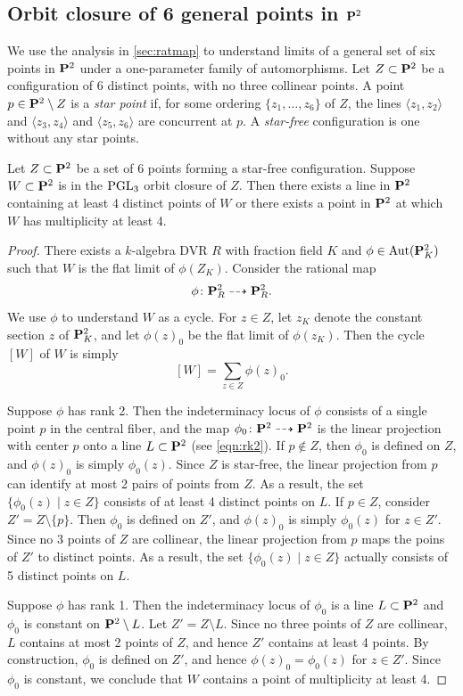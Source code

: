 \documentclass[12pt,reqno]{amsart}
\renewcommand{\k}{k}
\numberwithin{equation}{section}
\begin{document}
\subsection{Orbit closure of 6 general points in $\P^2$}\label{sec:orb6}
We use the analysis in \autoref{sec:ratmap} to understand limits of a general set of six points in $\P^2$ under a one-parameter family of automorphisms.
Let $Z \subset \P^2$ be a configuration of 6 distinct points, with no three collinear points.
A point $p \in \P^2 \setminus Z$ is a \emph{star point} if, for some ordering $\{z_1, \dots, z_6\}$ of $Z$, the lines $\langle z_1, z_2 \rangle$ and $\langle  z_3, z_4 \rangle$ and $\langle  z_5, z_6 \rangle$ are concurrent at $p$.
A \emph{star-free} configuration is one without any star points.

\begin{proposition}\label{prop:limit4}
  Let $Z \subset \P^2$ be a set of 6 points forming a star-free configuration.
  Suppose $W \subset \P^2$ is in the $\PGL_3$ orbit closure of $Z$.
  Then there exists a line in $\P^2$ containing at least 4 distinct points of $W$ or there exists a point in $\P^2$ at which $W$ has multiplicity at least 4.
\end{proposition}
\begin{proof}
  There exists a $\k$-algebra DVR $R$ with fraction field $K$ and $\phi \in \Aut(\P^2_K)$ such that $W$ is the flat limit of $\phi(Z_K)$.
  Consider the rational map
  \[ \phi \colon \P^2_R \dashrightarrow \P^2_R.\]
  We use $\phi$ to understand $W$ as a cycle.
  For $z \in Z$, let $z_K$ denote the constant section $z$ of $\P^2_K$, and let $\phi(z)_0$ be the flat limit of $\phi(z_K)$.
  Then the cycle $[W]$ of $W$ is simply
  \[ [W] = \sum_{z \in Z} \phi(z)_0.\]

  Suppose $\phi$ has rank 2.
  Then the indeterminacy locus of $\phi$ consists of a single point $p$ in the central fiber, and the map $\phi_0 \colon \P^2 \dashrightarrow \P^2$
  is the linear projection with center $p$ onto a line $L \subset \P^2$ (see \eqref{eqn:rk2}).
  If $p \not \in Z$, then  $\phi_0$ is defined on $Z$, and $\phi(z)_0$ is simply $\phi_0(z)$.
  Since $Z$ is star-free, the linear projection from $p$ can identify at most 2 pairs of points from $Z$.
  As a result, the set $\{\phi_0(z) \mid z \in Z\}$ consists of at least 4 distinct points on $L$.
  If $p \in Z$, consider $Z' = Z \setminus \{p\}$.
  Then $\phi_0$ is defined on $Z'$, and $\phi(z)_0$ is simply $\phi_0(z)$ for $z \in Z'$.
  Since no 3 points of $Z$ are collinear, the linear projection from $p$ maps the poins of $Z'$ to distinct points.
  As a result, the set $\{\phi_0(z) \mid z \in Z\}$ actually consists of 5 distinct points on $L$.

  Suppose $\phi$ has rank 1.
  Then the indeterminacy locus of $\phi_0$ is a line $L \subset \P^2$ and $\phi_0$ is constant on $\P^2 \setminus L$.
  Let $Z' = Z \setminus L$.
  Since no three points of $Z$ are collinear, $L$ contains at most 2 points of $Z$, and hence $Z'$ contains at least 4 points.
  By construction, $\phi_0$ is defined on $Z'$, and hence $\phi(z)_0 = \phi_0(z)$ for $z \in Z'$.
  Since $\phi_0$ is constant, we conclude that $W$ contains a point of multiplicity at least 4.
\end{proof}
\end{document}
